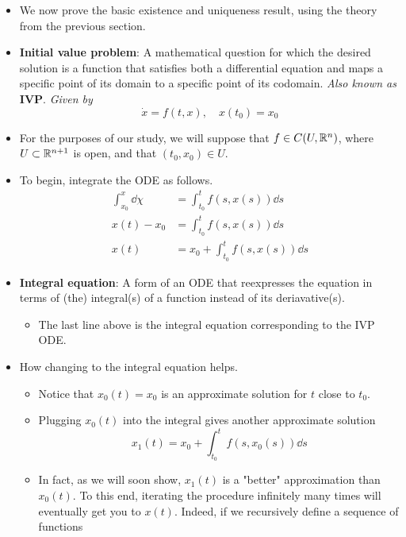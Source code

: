\documentclass[../notes.tex]{subfiles}
\begin{document}
\begin{itemize}
    \item We now prove the basic existence and uniqueness result, using the theory from the previous section.
    \item \textbf{Initial value problem}: A mathematical question for which the desired solution is a function that satisfies both a differential equation and maps a specific point of its domain to a specific point of its codomain. \emph{Also known as} \textbf{IVP}. \emph{Given by}
    \begin{equation*}
        \dot{x} = f(t,x)
        ,\quad
        x(t_0) = x_0
    \end{equation*}
    \item For the purposes of our study, we will suppose that $f\in C(U,\mathbb{R}^n)$, where $U\subset\mathbb{R}^{n+1}$ is open, and that $(t_0,x_0)\in U$.
    \item To begin, integrate the ODE as follows.
    \begin{align*}
        \int_{x_0}^x\dd{\chi} &= \int_{t_0}^tf(s,x(s))\dd{s}\\
        x(t)-x_0 &= \int_{t_0}^tf(s,x(s))\dd{s}\\
        x(t) &= x_0+\int_{t_0}^tf(s,x(s))\dd{s}
    \end{align*}
    \item \textbf{Integral equation}: A form of an ODE that reexpresses the equation in terms of (the) integral(s) of a function instead of its deriavative(s).
    \begin{itemize}
        \item The last line above is the integral equation corresponding to the IVP ODE.
    \end{itemize}
    \item How changing to the integral equation helps.
    \begin{itemize}
        \item Notice that $x_0(t)=x_0$ is an approximate solution for $t$ close to $t_0$.
        \item Plugging $x_0(t)$ into the integral gives another approximate solution
        \begin{equation*}
            x_1(t) = x_0+\int_{t_0}^tf(s,x_0(s))\dd{s}
        \end{equation*}
        \item In fact, as we will soon show, $x_1(t)$ is a "better" approximation than $x_0(t)$. To this end, iterating the procedure infinitely many times will eventually get you to $x(t)$. Indeed, if we recursively define a sequence of functions

\end{itemize}
\end{itemize}
\end{document}
